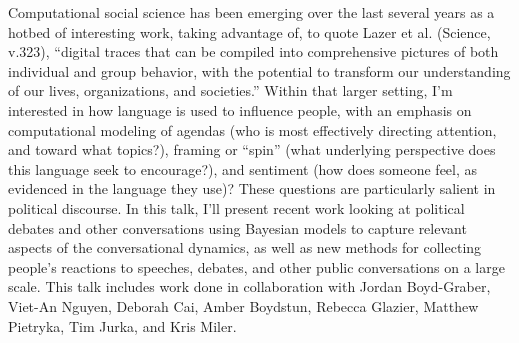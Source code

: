 Computational social science has been emerging over the last several years as a hotbed of interesting work, taking advantage of, to quote Lazer et al. (Science, v.323), ``digital traces that can be compiled into comprehensive pictures of both individual and group behavior, with the potential to transform our understanding of our lives, organizations, and societies.'' Within that larger setting, I'm interested in how language is used to influence people, with an emphasis on computational modeling of agendas (who is most effectively directing attention, and toward what topics?), framing or ``spin'' (what underlying perspective does this language seek to encourage?), and sentiment (how does someone feel, as evidenced in the language they use)?  These questions are particularly salient in political discourse.   In this talk, I'll present recent work looking at political debates and other conversations using Bayesian models to capture relevant aspects of the conversational dynamics, as well as new methods for collecting people's reactions to speeches, debates, and other public conversations on a large scale. This talk includes work done in collaboration with Jordan Boyd-Graber, Viet-An Nguyen, Deborah Cai, Amber Boydstun, Rebecca Glazier, Matthew Pietryka, Tim Jurka, and Kris Miler.

